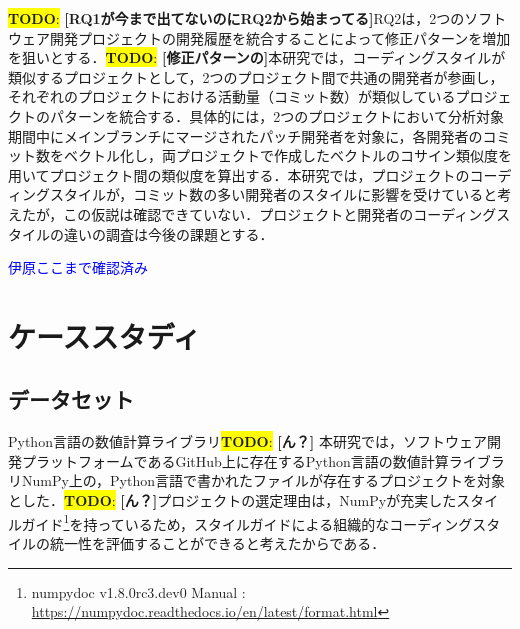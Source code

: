 \documentclass[T,J]{fose} %
\newcommand{\todo}[1]{\colorbox{yellow}{{\bf TODO}:}{\color{red} {\textbf{[#1]}}}}
\begin{document}
\todo{RQ1が今まで出てないのにRQ2から始まってる}RQ2は，2つのソフトウェア開発プロジェクトの開発履歴を統合することによって修正パターンを増加を狙いとする．\todo{修正パターンの}本研究では，コーディングスタイルが類似するプロジェクトとして，2つのプロジェクト間で共通の開発者が参画し，それぞれのプロジェクトにおける活動量（コミット数）が類似しているプロジェクトのパターンを統合する．具体的には，2つのプロジェクトにおいて分析対象期間中にメインブランチにマージされたパッチ開発者を対象に，各開発者のコミット数をベクトル化し，両プロジェクトで作成したベクトルのコサイン類似度を用いてプロジェクト間の類似度を算出する．本研究では，プロジェクトのコーディングスタイルが，コミット数の多い開発者のスタイルに影響を受けていると考えたが，この仮説は確認できていない．プロジェクトと開発者のコーディングスタイルの違いの調査は今後の課題とする．


\textcolor{blue}{伊原ここまで確認済み}

\section{ケーススタディ}\label{sec:casestudy}

\subsection{データセット}
Python言語の数値計算ライブラリ\todo{ん？}
本研究では，ソフトウェア開発プラットフォームであるGitHub上に存在するPython言語の数値計算ライブラリNumPy上の，Python言語で書かれたファイルが存在するプロジェクトを対象とした．\todo{ん？}プロジェクトの選定理由は，NumPyが充実したスタイルガイド\footnote{numpydoc v1.8.0rc3.dev0 Manual
: \url{https://numpydoc.readthedocs.io/en/latest/format.html}}を持っているため，スタイルガイドによる組織的なコーディングスタイルの統一性を評価することができると考えたからである．
\end{document}
